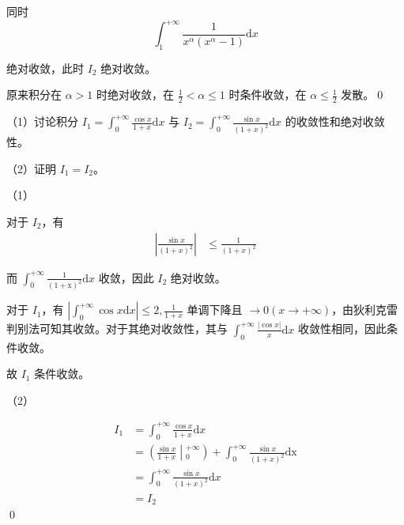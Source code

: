 同时
\begin{equation*}
	\int _{1}^{+\infty }\frac{1}{x^{\alpha }\left( x^{\alpha } -1\right)}\mathrm{d} x
\end{equation*}

绝对收敛，此时 $\displaystyle I_{2}$ 绝对收敛。

原来积分在 $\displaystyle \alpha  >1$ 时绝对收敛，在 $\displaystyle \frac{1}{2} < \alpha \leqslant 1$ 时条件收敛，在 $\displaystyle \alpha \leqslant \frac{1}{2}$ 发散。\qed 





\begin{ques}
	（1）讨论积分 $\displaystyle I_{1} =\int _{0}^{+\infty }\frac{\cos x}{1+x}\mathrm{d} x$ 与 $\displaystyle I_{2} =\int _{0}^{+\infty }\frac{\sin x}{( 1+x)^{2}}\mathrm{d} x$ 的收敛性和绝对收敛性。

（2）证明 $\displaystyle I_{1} =I_{2}$。
\end{ques}



（1）

对于 $\displaystyle I_{2}$，有
\begin{align*}
	\left| \frac{\sin x}{( 1+x)^{2}}\right|  & \leqslant \frac{1}{( 1+x)^{2}}
\end{align*}


而 $\displaystyle \int _{0}^{+\infty }\mathrm{\frac{1}{( 1+x)^{2}} d} x$ 收敛，因此 $\displaystyle I_{2}$ 绝对收敛。

对于 $\displaystyle I_{1}$，有 $\displaystyle \left| \int _{0}^{+\infty }\cos x\mathrm{d} x\right| \leqslant 2,\frac{1}{1+x}$ 单调下降且 $\displaystyle \rightarrow 0\left( x\rightarrow +\infty \right)$，由狄利克雷判别法可知其收敛。对于其绝对收敛性，其与 $\displaystyle \int _{0}^{+\infty }\frac{|\cos x|}{x}\mathrm{d} x$ 收敛性相同，因此条件收敛。

故 $\displaystyle I_{1}$ 条件收敛。



（2）


\begin{align*}
	I_{1} & =\int _{0}^{+\infty }\frac{\cos x}{1+x}\mathrm{d} x\\
	& =\left(\frac{\sin x}{1+x}\middle| _{0}^{+\infty }\right) +\int _{0}^{+\infty }\frac{\sin x}{( 1+x)^{2}}\mathrm{dx}\\
	& =\int _{0}^{+\infty }\frac{\sin x}{( 1+x)^{2}}\mathrm{d} x\\
	& =I_{2}
\end{align*}
\qed 



